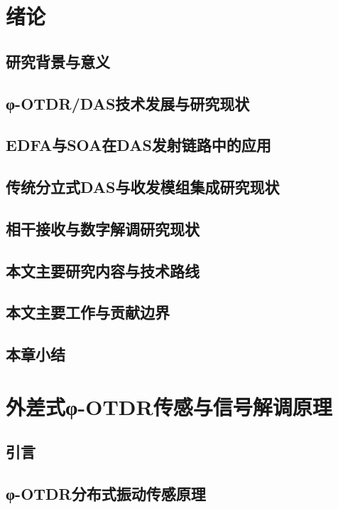 
\chapter{绪论}
\thispagestyle{main}

\section{研究背景与意义}
\section{φ-OTDR/DAS技术发展与研究现状}
\section{EDFA与SOA在DAS发射链路中的应用}
\section{传统分立式DAS与收发模组集成研究现状}
\section{相干接收与数字解调研究现状}
\section{本文主要研究内容与技术路线}
\section{本文主要工作与贡献边界}
\section{本章小结}

\chapter{外差式φ-OTDR传感与信号解调原理}
\thispagestyle{main}

\section{引言}
\section{φ-OTDR分布式振动传感原理}
